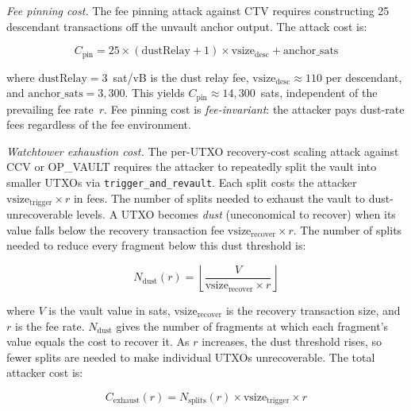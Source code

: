 \emph{Fee pinning cost.} The fee pinning attack against CTV requires constructing
25 descendant transactions off the unvault anchor output. The attack cost is:

\begin{equation} \label{eq:pin_cost}
C_{\text{pin}} = 25 \times (\text{dustRelay} + 1) \times \text{vsize}_{\text{desc}}
  + \text{anchor\_sats}
\end{equation}

\noindent
where $\text{dustRelay} = 3$~sat/vB is the dust relay fee, $\text{vsize}_{\text{desc}}
\approx 110$\vB{} per descendant, and $\text{anchor\_sats} = 3{,}300$. This yields
$C_{\text{pin}} \approx 14{,}300$~sats, independent of the prevailing fee rate~$r$.
Fee pinning cost is \emph{fee-invariant}: the attacker pays dust-rate fees regardless
of the fee environment.

\emph{Watchtower exhaustion cost.} The per-UTXO recovery-cost scaling attack against CCV or
OP\_VAULT requires the attacker to repeatedly split the vault into smaller UTXOs via
\texttt{trigger\_and\_revault}. Each split costs the attacker
$\text{vsize}_{\text{trigger}} \times r$ in fees. The number of splits needed to
exhaust the vault to dust-unrecoverable levels. A UTXO becomes \emph{dust} (uneconomical
to recover) when its value falls below the recovery transaction fee
$\text{vsize}_{\text{recover}} \times r$. The number of splits needed to reduce every
fragment below this dust threshold is:

\begin{equation} \label{eq:splits}
N_{\text{dust}}(r) = \left\lfloor \frac{V}{\text{vsize}_{\text{recover}} \times r}
  \right\rfloor
\end{equation}

\noindent
where $V$ is the vault value in sats, $\text{vsize}_{\text{recover}}$ is the
recovery transaction size, and $r$ is the fee rate. $N_{\text{dust}}$ gives the
number of fragments at which each fragment's value equals the cost to recover it.
As $r$ increases, the dust threshold rises, so fewer splits are needed to make
individual UTXOs unrecoverable. The total
attacker cost is:

\begin{equation} \label{eq:exhaust_cost}
C_{\text{exhaust}}(r) = N_{\text{splits}}(r) \times \text{vsize}_{\text{trigger}}
  \times r
\end{equation}

